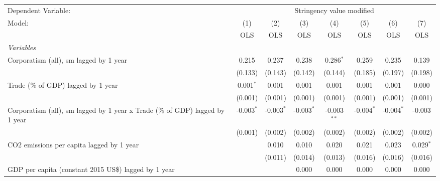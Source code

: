 
\begingroup
\centering
\begin{tabular}{lccccccc}
   \toprule
   Dependent Variable: & \multicolumn{7}{c}{Stringency value modified}\\
   Model:                                                                       & (1)          & (2)          & (3)          & (4)           & (5)          & (6)          & (7)\\  
                                                                                &  OLS         & OLS          & OLS          & OLS           & OLS          & OLS          & OLS\\  
   \midrule
   \emph{Variables}\\
   Corporatism (all), sm lagged by 1 year                                       & 0.215        & 0.237        & 0.238        & 0.286$^{*}$   & 0.259        & 0.235        & 0.139\\   
                                                                                & (0.133)      & (0.143)      & (0.142)      & (0.144)       & (0.185)      & (0.197)      & (0.198)\\   
   Trade (\% of GDP) lagged by 1 year                                           & 0.001$^{*}$  & 0.001        & 0.001        & 0.001         & 0.001        & 0.001        & 0.000\\   
                                                                                & (0.001)      & (0.001)      & (0.001)      & (0.001)       & (0.001)      & (0.001)      & (0.001)\\   
   Corporatism (all), sm lagged by 1 year x Trade (\% of GDP) lagged by 1 year  & -0.003$^{*}$ & -0.003$^{*}$ & -0.003$^{*}$ & -0.003$^{**}$ & -0.004$^{*}$ & -0.004$^{*}$ & -0.003\\   
                                                                                & (0.001)      & (0.002)      & (0.002)      & (0.002)       & (0.002)      & (0.002)      & (0.002)\\   
   CO2 emissions per capita lagged by 1 year                                    &              & 0.010        & 0.010        & 0.020         & 0.021        & 0.023        & 0.029$^{*}$\\   
                                                                                &              & (0.011)      & (0.014)      & (0.013)       & (0.016)      & (0.016)      & (0.016)\\   
   GDP per capita (constant 2015 US\$) lagged by 1 year                         &              &              & 0.000        & 0.000         & 0.000        & 0.000        & 0.000\\   

\end{tabular}
